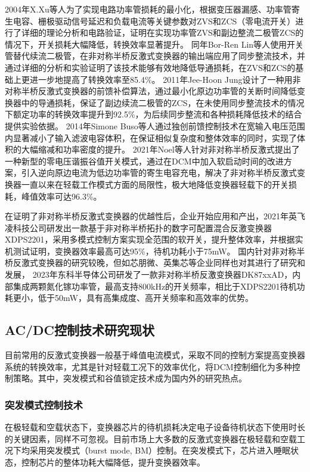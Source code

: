 2004年X.Xu等人\cite{xu2004_AHB}为了实现电路功率管损耗的最小化，根据变压器漏感、功率管寄生电容、栅极驱动信号延迟和负载电流等关键参数对ZVS和ZCS（零电流开关）进行了详细的理论分析和电路验证，证明在实现功率管ZVS和副边整流二极管ZCS的情况下，开关损耗大幅降低，转换效率显著提升。
同年Bor-Ren Lin等人\cite{lin2005_AHB}使用开关管替代续流二极管，在非对称半桥反激式变换器的输出端应用了同步整流技术，并通过详细的分析和实验证明了该技术能够有效地降低导通损耗，在ZVS和ZCS的基础上更进一步地提高了转换效率至85.4\%。
2011年Jee-Hoon Jung\cite{jung2011_AHB}设计了一种用非对称半桥反激式变换器的前馈补偿算法，通过最小化原边功率管的关断时间降低变换器中的导通损耗，保证了副边续流二极管的ZCS，在未使用同步整流技术的情况下额定功率的转换效率提升到92.5\%，为后续同步整流和各种损耗降低技术的结合提供实验依据。
2014年Simone Buso等人\cite{buso2014_AHB}通过独创前馈控制技术在宽输入电压范围内显著减小了输入滤波电容体积，在保证相似复杂度和整体效率的同时，实现了体积的大幅缩减和功率密度的提升。
2021年Noel等人\cite{medina2021advanced}针对非对称半桥反激式提出了一种新型的零电压谐振谷值开关模式，通过在DCM中加入软启动时间的改进方案，引入逆向原边电流为低边功率管的寄生电容充电，解决了非对称半桥反激式变换器一直以来在轻载工作模式方面的局限性，极大地降低变换器轻载下的开关损耗，峰值效率可达96.3\%。

在证明了非对称半桥反激式变换器的优越性后，企业开始应用和产出，2021年英飞凌科技公司研发出一款基于非对称半桥拓扑的数字可配置混合反激变换器XDPS2201，采用多模式控制方案实现全范围的软开关，提升整体效率，并根据实机测试证明，变换器效率最高可达95\%，待机功耗小于75mW。
国内针对非对称半桥反激式变换器的研究较晚，但如芯朋微、英集芯等企业同样也对其进行了研究和发展，
2023年东科半导体公司研发了一款非对称半桥反激变换器DK87xxAD，内部集成两颗氮化镓功率管，最高支持800kHz的开关频率，相比于XDPS2201待机功耗更小，低于50mW，具有高集成度、高开关频率和高效率的优势。

\subsection{AC/DC控制技术研究现状}

目前常用的反激式变换器一般基于峰值电流模式，采取不同的控制方案提高变换器系统的转换效率，尤其是针对轻载工况下的效率优化，将DCM控制细化为多种控制策略。其中，突发模式和谷值锁定技术成为国内外的研究热点。

\subsubsection{突发模式控制技术}

在极轻载和空载状态下，变换器芯片的待机损耗决定电子设备待机状态下使用时长的关键因素，同样不可忽视。目前市场上大多数的反激式变换器在极轻载和空载工况下均采用突发模式（burst mode, BM）控制。在突发模式下，芯片进入睡眠状态，控制芯片的整体功耗大幅降低，提升变换器效率。

